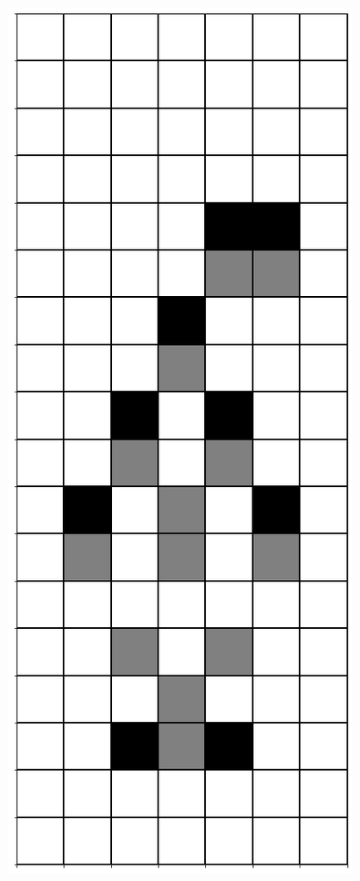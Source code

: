 \documentclass[12pt]{article}
\numberwithin{figure}{section} %
\begin{document}
\begin{figure}[H]
\begin{subfigure}{0.19\textwidth}
     \subcaption{}
   \end{subfigure}
     \begin{subfigure}{0.19\textwidth}
     \centering
     \includegraphics[width=\linewidth]{Section4/18.1}

\end{subfigure}
\end{figure}
\end{document}
